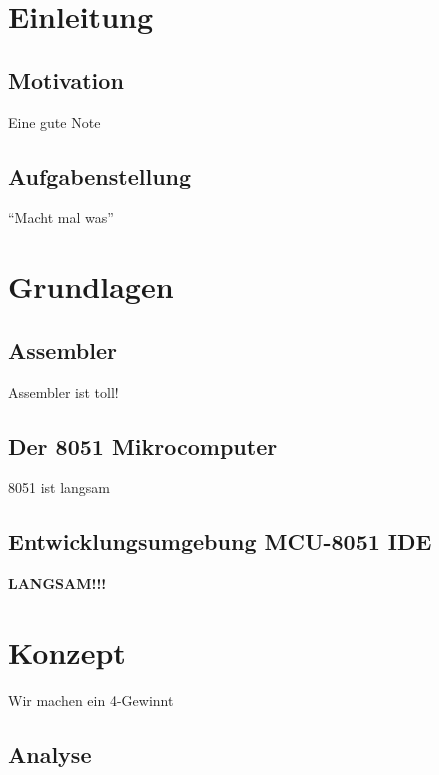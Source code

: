 


\newcommand{\autor}{Heidinger, Matthis, Riesinger, Stephan}
\newcommand{\kurs}{TINF17B1}
\newcommand{\titel}{4-Gewinnt auf einem Mikrocomputer der 8051-Famile}



\tableofcontents 

\chapter{Einleitung}

\section{Motivation}

Eine gute Note

\section{Aufgabenstellung}

\enquote{Macht mal was}

\chapter{Grundlagen}

\section{Assembler}

Assembler ist toll!

\section{Der 8051 Mikrocomputer}

8051 ist langsam

\section{Entwicklungsumgebung MCU-8051 IDE}

\textbf{LANGSAM!!!}

\chapter{Konzept}

Wir machen ein 4-Gewinnt

\section{Analyse}


